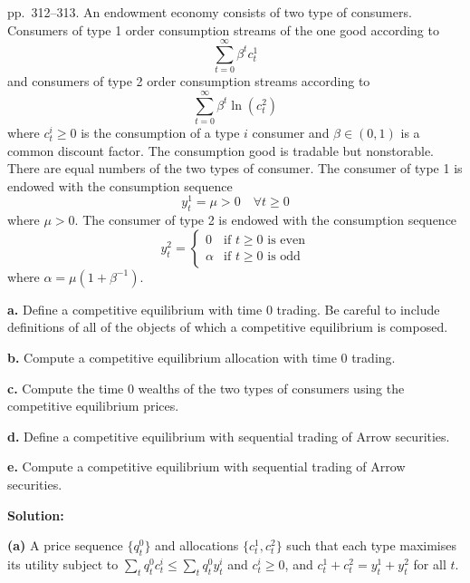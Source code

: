 \documentclass[12pt, letterpaper]{article}
\begin{document}
\begin{tcolorbox}[oddbox,title={Exercise 8.9 \quad A competitive equilibrium}]
\begin{tcolorbox}[questionbox]
pp.~312--313. An endowment economy consists of two type of consumers. Consumers of type 1 order consumption
streams of the one good according to
\[
\sum_{t=0}^\infty\beta^tc^1_t
\]
and consumers of type 2 order consumption streams according to
\[
\sum_{t=0}^\infty\beta^t\ln(c^2_t)
\]
where $c^i_t\ge0$ is the consumption of a type $i$ consumer and $\beta\in(0,1)$ is a common discount factor.
The consumption good is tradable but nonstorable. There are equal numbers of the two types of consumer.
The consumer of type 1 is endowed with the consumption sequence
\[
y^1_t=\mu>0\quad\forall t\ge0
\]
where $\mu>0$. The consumer of type 2 is endowed with the consumption sequence
\[
y^2_t=\begin{cases}0&\text{if }t\ge0\text{ is even}\\\alpha&\text{if }t\ge0\text{ is odd}\end{cases}
\]
where $\alpha=\mu(1+\beta^{-1})$.

\textbf{a.} Define a competitive equilibrium with time 0 trading. Be careful to include definitions of all of
the objects of which a competitive equilibrium is composed.

\textbf{b.} Compute a competitive equilibrium allocation with time 0 trading.

\textbf{c.} Compute the time 0 wealths of the two types of consumers using the competitive equilibrium
prices.

\textbf{d.} Define a competitive equilibrium with sequential trading of Arrow securities.

\textbf{e.} Compute a competitive equilibrium with sequential trading of Arrow securities.
\end{tcolorbox}

\textbf{Solution:}

\textbf{(a)} A price sequence $\{q^0_t\}$ and allocations $\{c^1_t,c^2_t\}$ such that each type maximises its utility
subject to $\sum_tq^0_tc^i_t\le\sum_tq^0_ty^i_t$ and $c^i_t\ge0$, and $c^1_t+c^2_t=y^1_t+y^2_t$ for all $t$.


\end{tcolorbox}
\end{document}

